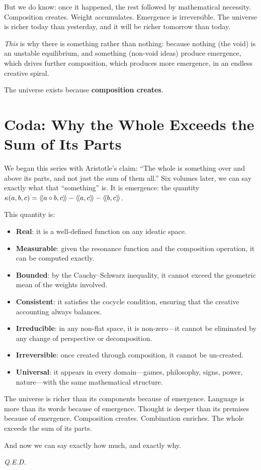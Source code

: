 But we do know: once it happened, the rest followed by mathematical necessity.
Composition creates. Weight accumulates. Emergence is irreversible. The universe
is richer today than yesterday, and it will be richer tomorrow than today.

\emph{This} is why there is something rather than nothing: because nothing
(the void) is an unstable equilibrium, and something (non-void ideas) produce
emergence, which drives further composition, which produces more emergence,
in an endless creative spiral.

The universe exists because \textbf{composition creates}.


\section{Coda: Why the Whole Exceeds the Sum of Its Parts}

We began this series with Aristotle's claim: ``The whole is something over and
above its parts, and not just the sum of them all.'' Six volumes later, we can
say exactly what that ``something'' is. It is emergence: the quantity
$\kappa(a,b,c) = \langle\!\langle a \circ b, c \rangle\!\rangle - \langle\!\langle a, c \rangle\!\rangle - \langle\!\langle b, c \rangle\!\rangle$.

This quantity is:
\begin{itemize}
  \item \textbf{Real}: it is a well-defined function on any ideatic space.
  \item \textbf{Measurable}: given the resonance function and the composition
    operation, it can be computed exactly.
  \item \textbf{Bounded}: by the Cauchy--Schwarz inequality, it cannot exceed
    the geometric mean of the weights involved.
  \item \textbf{Consistent}: it satisfies the cocycle condition, ensuring that
    the creative accounting always balances.
  \item \textbf{Irreducible}: in any non-flat space, it is non-zero---it cannot
    be eliminated by any change of perspective or decomposition.
  \item \textbf{Irreversible}: once created through composition, it cannot be
    un-created.
  \item \textbf{Universal}: it appears in every domain---games, philosophy,
    signs, power, nature---with the same mathematical structure.
\end{itemize}

The universe is richer than its components because of emergence. Language is
more than its words because of emergence. Thought is deeper than its premises
because of emergence. Composition creates. Combination enriches. The whole
exceeds the sum of its parts.

And now we can say exactly how much, and exactly why.

\begin{flushright}
\textit{Q.E.D.}
\end{flushright}
